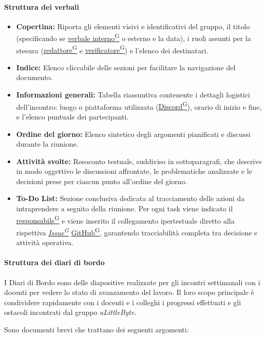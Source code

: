 \documentclass[a4paper,12pt]{article}
\providecommand{\glslink}[2]{\href{https://alittlebyte-19.github.io/Documentazione/glossario.html\#gls-#1}{\underline{#2}\textsuperscript{\scriptsize G}}}
\begin{document}
\paragraph{Struttura dei verbali}\label{sec:documentazione}
\begin{itemize}
    \item \textbf{Copertina:} Riporta gli elementi visivi e identificativi del gruppo, il titolo (specificando se \glslink{verbale-interno}{verbale interno} o esterno e la data), i ruoli assunti per la stesura (\glslink{redattore}{redattore} e \glslink{verificatore}{verificatore}) e l'elenco dei destinatari.
    \item \textbf{Indice:} Elenco cliccabile delle sezioni per facilitare la navigazione del documento.
    \item \textbf{Informazioni generali:} Tabella riassuntiva contenente i dettagli logistici dell'incontro: luogo o piattaforma utilizzata (\glslink{discord}{Discord}), orario di inizio e fine, e l'elenco puntuale dei partecipanti.
    \item \textbf{Ordine del giorno:} Elenco sintetico degli argomenti pianificati e discussi durante la riunione.
    \item \textbf{Attività svolte:} Resoconto testuale, suddiviso in sottoparagrafi, che descrive in modo oggettivo le discussioni affrontate, le problematiche analizzate e le decisioni prese per ciascun punto all'ordine del giorno.
    \item \textbf{To-Do List:} Sezione conclusiva dedicata al tracciamento delle azioni da intraprendere a seguito della riunione. Per ogni task viene indicato il \glslink{responsabile}{responsabile} e viene inserito il collegamento ipertestuale diretto alla rispettiva \textit{\glslink{issue}{Issue}} \glslink{github}{GitHub}, garantendo tracciabilità completa tra decisione e attività operativa.
\end{itemize}

\paragraph{Struttura dei diari di bordo}
I Diari di Bordo sono delle diapositive realizzate per gli incontri settimanali con i docenti per vedere lo stato di avanzamento del lavoro. Il loro scopo principale è condividere rapidamente con i docenti e i colleghi i progressi effettuati e gli ostacoli incontrati dal gruppo \textit{aLittleByte}. 

Sono documenti brevi che trattano dei seguenti argomenti:
\end{document}
